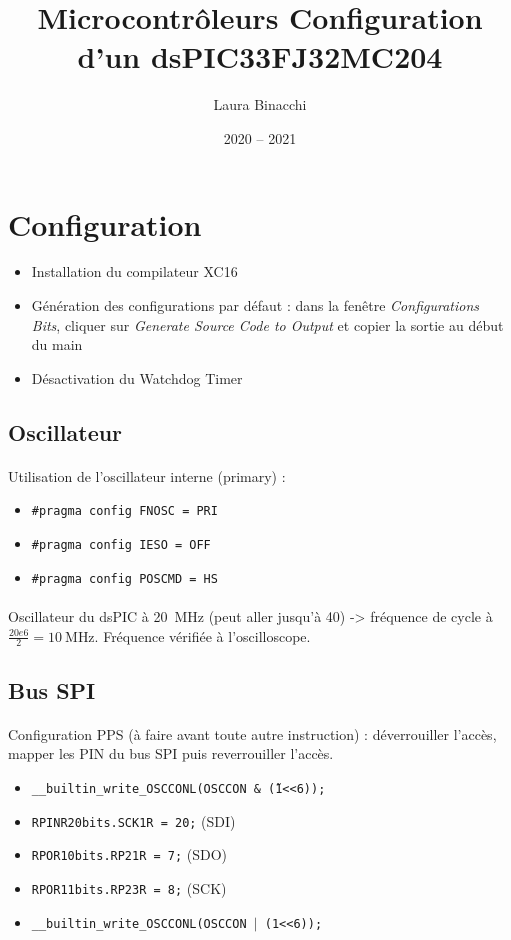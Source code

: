 \documentclass{article}
\title{Microcontrôleurs\bigbreak \bigbreak
    \large Configuration d'un dsPIC33FJ32MC204}
\date{2020 -- 2021}
\author{Laura Binacchi}
\begin{document}

    \section{Configuration}
    \begin{itemize}
        \item Installation du compilateur XC16
        \item Génération des configurations par défaut : dans la fenêtre \emph{Configurations Bits}, cliquer sur \emph{Generate Source Code to Output} et copier la sortie au début du main
        \item Désactivation du Watchdog Timer
    \end{itemize}


    \subsection{Oscillateur}
    \paragraph{}
    Utilisation de l'oscillateur interne (primary) :
    \begin{itemize}
        \item \texttt{\#pragma config FNOSC = PRI}
        \item \texttt{\#pragma config IESO = OFF}
        \item \texttt{\#pragma config POSCMD = HS}
    \end{itemize}
    \paragraph{}
    Oscillateur du dsPIC à \SI{20}{\mega\hertz} (peut aller jusqu'à 40) -> fréquence de cycle à $\frac{20e6}{2} = \SI{10}{\mega\hertz}$. Fréquence vérifiée à l'oscilloscope.


    \subsection{Bus SPI}
    \paragraph{}
    Configuration PPS (à faire avant toute autre instruction) : déverrouiller l'accès, mapper les PIN du bus SPI puis reverrouiller l'accès.
    \begin{itemize}
        \item \texttt{\_\_builtin\_write\_OSCCONL(OSCCON \& \~(1<<6));}
        \item \texttt{RPINR20bits.SCK1R = 20;} (SDI)
        \item \texttt{RPOR10bits.RP21R = 7;} (SDO)
        \item \texttt{RPOR11bits.RP23R = 8;} (SCK)
        \item \texttt{\_\_builtin\_write\_OSCCONL(OSCCON $|$ (1<<6));}
    \end{itemize}
\end{document}
